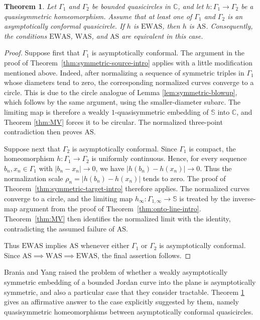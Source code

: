 \documentclass[10pt,a4paper]{amsart}
\numberwithin{equation}{section}
\newtheorem{theorem}{Theorem}[section]
\newcommand{\C}{\mathbb{C}}
\begin{document}
\begin{theorem}\label{thm:compact-one-symmetric}
Let $\Gamma_1$ and $\Gamma_2$ be bounded quasicircles in $\C$, and let $h\colon\Gamma_1\to\Gamma_2$ be a quasisymmetric homeomorphism. 
Assume that at least one of $\Gamma_1$ and $\Gamma_2$ is an asymptotically conformal quasicircle.  
If $h$ is $\mathrm{EWAS}$, then $h$ is $\mathrm{AS}$.  
Consequently, the conditions $\mathrm{EWAS}$, $\mathrm{WAS}$, and $\mathrm{AS}$ are equivalent in this case.
\end{theorem}

\begin{proof}
Suppose first that $\Gamma_1$ is asymptotically conformal.  
The argument in the proof of Theorem~\ref{thm:symmetric-source-intro} applies with a little modification mentioned above.
Indeed, after normalizing a sequence of symmetric triples in $\Gamma_1$ whose diameters tend to zero, the corresponding normalized curves converge to a circle. This is due to 
the circle analogue of Lemma \ref{lem:symmetric-blowup}, which follows by the same argument, using the smaller-diameter subarc. 
The limiting map is therefore a weakly $1$-quasisymmetric embedding of $\mathbb S$ into $\C$, and Theorem \ref{thm:MV} forces it to be circular.  
The normalized three-point contradiction then proves $\mathrm{AS}$.

Suppose next that $\Gamma_2$ is asymptotically conformal.  
Since $\Gamma_1$ is compact, the homeomorphism $h\colon\Gamma_1\to\Gamma_2$ is uniformly continuous.  
Hence, for every sequence $b_n,x_n\in\Gamma_1$ with $|b_n-x_n|\to 0$, we have $|h(b_n)-h(x_n)|\to 0$.
Thus the normalization scale $\rho_n=|h(b_n)-h(x_n)|$ tends to zero.  
The proof of Theorem~\ref{thm:symmetric-target-intro} therefore applies. 
The normalized curves converge to a circle, and the limiting map $h_\infty\colon\Gamma_{1,\infty}\to\mathbb S$ is treated by the inverse-map argument from the proof of Theorem~\ref{thm:onto-line-intro}.  
Theorem~\ref{thm:MV} then identifies the normalized limit with the identity, contradicting the assumed failure of $\mathrm{AS}$.

Thus $\mathrm{EWAS}$ implies $\mathrm{AS}$ whenever either $\Gamma_1$ or $\Gamma_2$ is asymptotically conformal. 
Since $\mathrm{AS}\implies\mathrm{WAS}\implies\mathrm{EWAS}$, the final assertion follows.
\end{proof}


Brania and Yang \cite[p.2678]{BraniaYang} raised the problem of whether a weakly asymptotically symmetric embedding of a bounded Jordan curve into the plane is asymptotically symmetric, and also a particular case that they consider tractable.
Theorem \ref{thm:compact-one-symmetric} gives an affirmative answer to the case explicitly suggested by them, namely quasisymmetric homeomorphisms between asymptotically conformal quasicircles.
\end{document}
